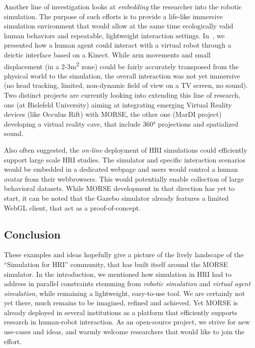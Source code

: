 \documentclass{llncs}
\begin{document}
Another line of investigation looks at \emph{embedding} the researcher into the
robotic simulation. The purpose of such efforts is to provide a life-like
immersive simulation environment that would allow at the same time ecologically
valid human behaviors and repeatable, lightweight interaction settings.
In~\cite{lemaignan2012morse}, we presented how a human agent could interact with
a virtual robot through a deictic interface based on a Kinect. While arm
movements and small displacement (in a 2-3m\textsuperscript{2} zone) could be
fairly accurately transposed from the physical world to the simulation, the
overall interaction was not yet immersive (no head tracking, limited,
non-dynamic field of view on a TV screen, no sound). Two distinct projects are
currently looking into extending this line of research, one (at Bielefeld
University) aiming at integrating emerging Virtual Reality devices (like Occulus
Rift) with MORSE, the other one (MarDI project) developing a virtual reality
cave, that include 360° projections and spatialized sound.

Also often suggested, the \emph{on-line} deployment of HRI simulations could
efficiently support large scale HRI studies. The simulator and specific
interaction scenarios would be embedded in a dedicated webpage and users would
control a human avatar from their webbrowsers. This would potentially enable
collection of large behavioral datasets. While MORSE development in that
direction has yet to start, it can be noted that the Gazebo simulator already
features a limited WebGL client, that act as a proof-of-concept.


\subsection*{Conclusion}

These examples and ideas hopefully give a picture of the lively landscape of the
``Simulation for HRI'' community, that has built itself around the MORSE
simulator.  In the introduction, we mentioned how simulation in HRI had to
address in parallel constraints stemming from \emph{robotic simulation} and
\emph{virtual agent simulation}, while remaining a lightweight, easy-to-use
tool. We are certainly not yet there, much remains to be imagined, refined and
achieved.  Yet MORSE is already deployed in several institutions as a platform
that efficiently supports research in human-robot interaction. As an open-source
project, we strive for new use-cases and ideas, and warmly welcome researchers
that would like to join the effort.





\end{document}
